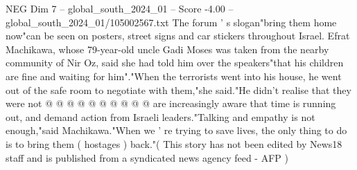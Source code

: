 \begin{textsample}{NEG Dim 7 – global\_south\_2024\_01 – Score -4.00 – global\_south\_2024\_01/105002567.txt}
The forum ' s slogan"bring them home now"can be seen on posters, street signs and car stickers throughout Israel.
Efrat Machikawa, whose 79-year-old uncle Gadi Moses was taken from the nearby community of Nir Oz, said she had told him over the speakers"that his children are fine and waiting for him"."When the terrorists went into his house, he went out of the safe room to negotiate with them,"she said."He didn't realise that they were not @ @ @ @ @ @ @ @ @ @ are increasingly aware that time is running out, and demand action from Israeli leaders."Talking and empathy is not enough,"said Machikawa."When we ' re trying to save lives, the only thing to do is to bring them ( hostages ) back."( This story has not been edited by News18 staff and is published from a syndicated news agency feed - AFP )

\end{textsample}
